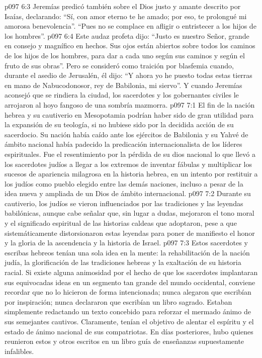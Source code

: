 \vs p097 6:3 Jeremías predicó también sobre el Dios justo y amante descrito por Isaías, declarando: “Sí, con amor eterno te he amado; por eso, te prolongué mi amorosa benevolencia”. “Pues no se complace en afligir o entristecer a los hijos de los hombres”.
\vs p097 6:4 Este audaz profeta dijo: “Justo es nuestro Señor, grande en consejo y magnífico en hechos. Sus ojos están abiertos sobre todos los caminos de los hijos de los hombres, para dar a cada uno según sus caminos y según el fruto de sus obras”. Pero se consideró como traición por blasfemia cuando, durante el asedio de Jerusalén, él dijo: “Y ahora yo he puesto todas estas tierras en mano de Nabucodonosor, rey de Babilonia, mi siervo”. Y cuando Jeremías aconsejó que se rindiera la ciudad, los sacerdotes y los gobernantes civiles le arrojaron al hoyo fangoso de una sombría mazmorra.
\vs p097 7:1 El fin de la nación hebrea y su cautiverio en Mesopotamia podrían haber sido de gran utilidad para la expansión de su teología, si no hubiese sido por la decidida acción de su sacerdocio. Su nación había caído ante los ejércitos de Babilonia y su Yahvé de ámbito nacional había padecido la predicación internacionalista de los líderes espirituales. Fue el resentimiento por la pérdida de su dios nacional lo que llevó a los sacerdotes judíos a llegar a los extremos de inventar fábulas y multiplicar los sucesos de apariencia milagrosa en la historia hebrea, en un intento por restituir a los judíos como pueblo elegido entre las demás naciones, incluso a pesar de la idea nueva y ampliada de un Dios de ámbito internacional.
\vs p097 7:2 Durante su cautiverio, los judíos se vieron influenciados por las tradiciones y las leyendas babilónicas, aunque cabe señalar que, sin lugar a dudas, mejoraron el tono moral y el significado espiritual de las historias caldeas que adoptaron, pese a que sistemáticamente distorsionaron estas leyendas para poner de manifiesto el honor y la gloria de la ascendencia y la historia de Israel.
\vs p097 7:3 Estos sacerdotes y escribas hebreos tenían una sola idea en la mente: la rehabilitación de la nación judía, la glorificación de las tradiciones hebreas y la exaltación de su historia racial. Si existe alguna animosidad por el hecho de que los sacerdotes implantaran sus equivocadas ideas en un segmento tan grande del mundo occidental, conviene recordar que no lo hicieron de forma intencionada; nunca alegaron que escribían por inspiración; nunca declararon que escribían un libro sagrado. Estaban simplemente redactando un texto concebido para reforzar el mermado ánimo de sus semejantes cautivos. Claramente, tenían el objetivo de alentar el espíritu y el estado de ánimo nacional de sus compatriotas. En días posteriores, hubo quienes reunieron estos y otros escritos en un libro guía de enseñanzas supuestamente infalibles.
